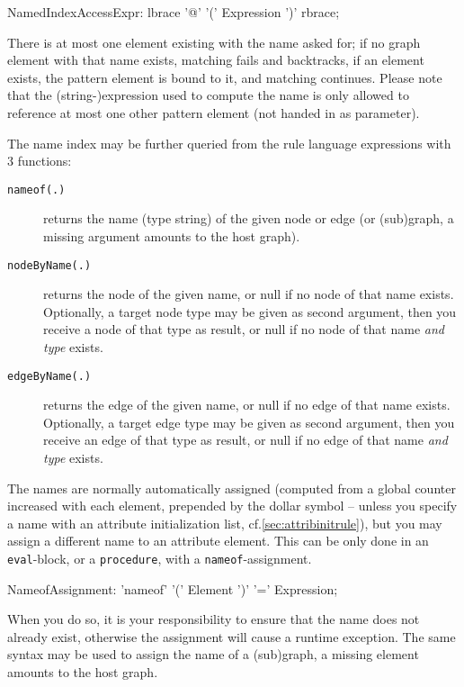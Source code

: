 \makeatletter
\begin{rail}
  NamedIndexAccessExpr:
    lbrace '@' '(' Expression ')' rbrace;
\end{rail}
\makeatother

There is at most one element existing with the name asked for; if no graph element with that name exists, matching fails and backtracks, if an element exists, the pattern element is bound to it, and matching continues.
Please note that the (string-)expression used to compute the name is only allowed to reference at most one other pattern element (not handed in as parameter).

The name index may be further queried from the rule language expressions with 3 functions:
\begin{description}
\item[\texttt{nameof(.)}] returns the name (type string) of the given node or edge (or (sub)graph, a missing argument amounts to the host graph).
\item[\texttt{nodeByName(.)}] returns the node of the given name, or null if no node of that name exists. Optionally, a target node type may be given as second argument, then you receive a node of that type as result, or null if no node of that name \emph{and type} exists.
\item[\texttt{edgeByName(.)}] returns the edge of the given name, or null if no edge of that name exists. Optionally, a target edge type may be given as second argument, then you receive an edge of that type as result, or null if no edge of that name \emph{and type} exists.
\end{description}

The names are normally automatically assigned (computed from a global counter increased with each element, prepended by the dollar symbol -- unless you specify a name with an attribute initialization list, cf.\ref{sec:attribinitrule}), but you may assign a different name to an attribute element.
This can be only done in an \texttt{eval}-block, or a \texttt{procedure}, with a \texttt{nameof}-assignment.

\begin{rail}
  NameofAssignment:
    'nameof' '(' Element ')' '=' Expression;
\end{rail}

When you do so, it is your responsibility to ensure that the name does not already exist, otherwise the assignment will cause a runtime exception.
The same syntax may be used to assign the name of a (sub)graph, a missing element amounts to the host graph.

